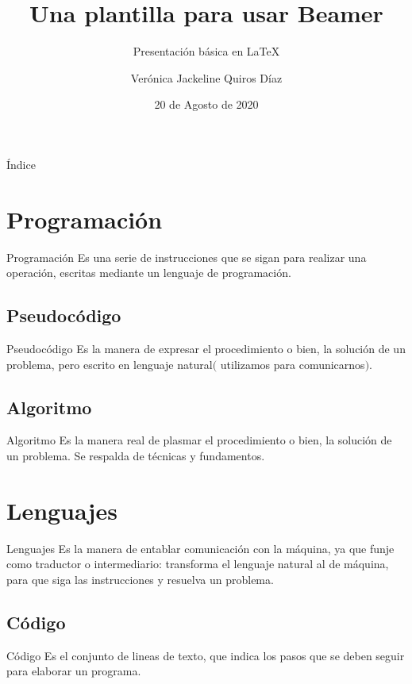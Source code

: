 \documentclass[11pt]{beamer}
\author[TL62\_VJQD]{Verónica Jackeline Quiros Díaz}
\title[Clase Beamer]{Una plantilla para usar Beamer}
\date{20 de Agosto de 2020}
\subtitle{Presentación básica en \LaTeX}
\begin{document}
\maketitle

    \begin{frame}{Índice}
		\tableofcontents
	\end{frame}
    \section{Programación}
		\begin{frame}{Programación}
		Es una serie de instrucciones que se sigan para realizar una operación, escritas mediante un lenguaje de programación.
		\end{frame}
    \subsection{Pseudocódigo}
            \begin{frame}{Pseudocódigo}
            \centering
			Es la manera de expresar el procedimiento o bien, la solución de un problema, pero escrito en lenguaje natural$($ utilizamos para comunicarnos$).$
			\end{frame}
	\subsection{Algoritmo}
            \begin{frame}{Algoritmo}
			\justifying
			Es la manera real de plasmar el procedimiento o bien, la solución de un problema. Se respalda de técnicas y fundamentos.
			\end{frame}
    \section{Lenguajes}
		\begin{frame}{Lenguajes}
			\justifying
			Es la manera de entablar comunicación con la máquina, ya que funje como traductor o intermediario: transforma el lenguaje natural al de máquina, para que siga las instrucciones y resuelva un problema.
		\end{frame}
	\subsection{Código}	
	    \begin{frame}{Código}
			\justifying
			Es el conjunto de lineas de texto, que indica los pasos que se deben seguir para elaborar un programa.
		\end{frame}
\end{document}
